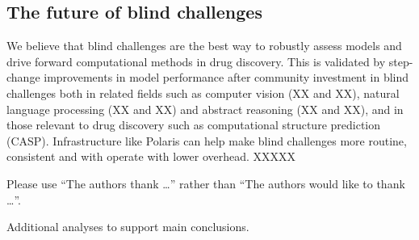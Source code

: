 \documentclass[journal=jcim,manuscript=article]{achemso}
\begin{document}


\subsection{The future of blind challenges}

We believe that blind challenges are the best way to robustly assess models and drive forward computational methods in drug discovery. This is validated by step-change improvements in model performance after community investment in blind challenges both in related fields such as computer vision (XX and XX), natural language processing (XX and XX) and abstract reasoning (XX and XX), and in those relevant to drug discovery such as computational structure prediction (CASP). Infrastructure like Polaris can help make blind challenges more routine, consistent and with operate with lower overhead. XXXXX


\begin{acknowledgement}

Please use ``The authors thank \ldots'' rather than ``The
authors would like to thank \ldots''.

\end{acknowledgement}

\begin{suppinfo}

Additional analyses to support main conclusions. 

\end{suppinfo}


\end{document}
